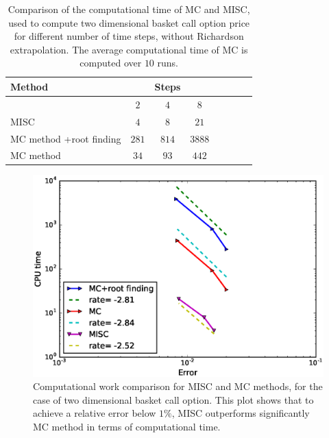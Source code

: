 \begin{table}[h!]
	\centering
	\begin{tabular}{l*{6}{c}r}
		\toprule[1.5pt]
	Method & & Steps  & &     \\
	\hline
	         & $2$ & $4$ & $8$    \\
		\hline
		MISC & $4$  & $8$ & $21$     \\
			MC method +root finding  & $281$&  $814$&  $3888$   \\
				MC method &   $34$& $93$ &   $ 442$ \\
		\bottomrule[1.25pt]
	\end{tabular}
	\caption{Comparison of the computational time of  MC and MISC, used to compute two dimensional basket call option price  for different number of time steps, without Richardson extrapolation. The average computational time of MC is computed over $10$ runs.}
	\label{Comparsion of the computational time of  MC and MISC, used to compute two dim basket Call option price  for different number of time steps, without Richardson extrapolation}
\end{table}


\FloatBarrier
	\begin{figure}[h!]
\centering
\includegraphics[width=0.4\linewidth]{./figures/basket_call_2d_time_stepping/complexity_rates/error_vs_time}

\caption{Computational work comparison for MISC and MC methods, for the case of two dimensional basket call option. This plot shows that to achieve a relative error below $1\%$, MISC outperforms significantly MC method in terms of computational time.}
\label{fig:Complexity plot for MC and MISC , two dim basket call non rich}
\end{figure}


\FloatBarrier

